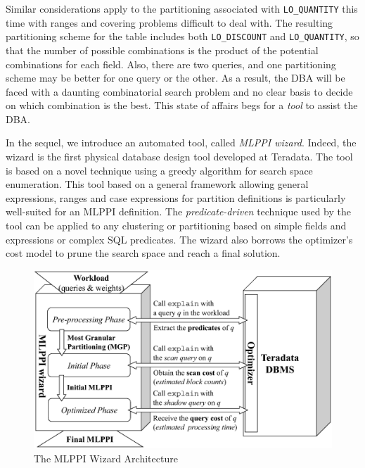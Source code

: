 \documentclass[runningheads]{comsis2}
\begin{document}
Similar considerations apply to the partitioning associated with {\tt LO\_QUANTITY} 
this time with ranges and covering problems difficult to deal with. 
The resulting partitioning scheme for the table includes both {\tt LO\_DISCOUNT}
and {\tt LO\_QUANTITY}, so that the number of possible combinations is the product of 
the potential combinations for each field. 
Also, there are two queries, and one partitioning scheme may be better for one query or the other. 
As a result, the DBA will be faced with a daunting combinatorial search problem 
and no clear basis to decide on which combination is the best. 
This state of affairs begs for a {\em tool} to assist the DBA.

In the sequel, we introduce an automated tool, called {\em MLPPI wizard}. 
Indeed, the \hbox{wizard} is the first physical database design tool 
developed at Teradata.
The tool is based on a novel technique using a greedy algorithm for 
search space enumeration. 
This tool based on a general framework allowing general expressions, 
ranges and case expressions for \hbox{partition} \hbox{definitions} 
is particularly well-suited for an MLPPI definition. \linebreak
The {\em predicate-driven} \hbox{technique} used by the tool can be applied 
to any clustering or partitioning based on simple fields and expressions or complex SQL predicates. 
The wizard also borrows the optimizer's cost model 
to prune the search space and reach a final solution. 

\begin{figure}[htp!]
\centering
\includegraphics[scale=0.5]{architecture}
\caption{The MLPPI Wizard Architecture\label{fig:arch}}
\end{figure}
\end{document}
